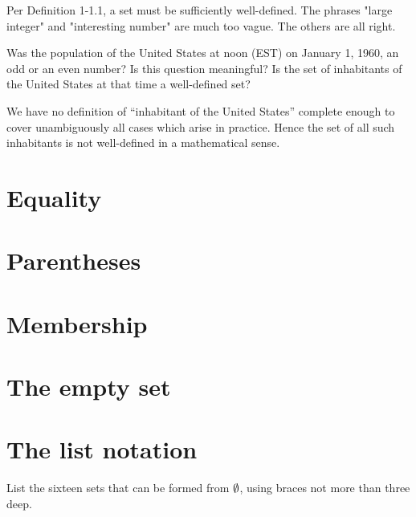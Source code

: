 \documentclass{report}
\begin{document}
\begin{solution}
Per Definition 1-1.1, a set must be sufficiently well-defined. 
The phrases "large integer" and "interesting number" are much too vague. The others are all right.
\end{solution}


\begin{exercise}
Was the population of the United States at noon (EST) on January 1, 1960, an odd
or an even number? Is this question meaningful? Is the set of inhabitants of the United
States at that time a well-defined set?
\end{exercise}

\begin{solution}
We have no definition of ``inhabitant of the United States'' complete enough to
cover unambiguously all cases which arise in practice. Hence the set of all such
inhabitants is not well-defined in a mathematical sense.
\end{solution}


\section{Equality}
\section{Parentheses}
\section{Membership}
\section{The empty set}
\section{The list notation}

\begin{exercise}
List the sixteen sets that can be formed from $\emptyset$, using braces not more than three deep.
\end{exercise}
\end{document}
